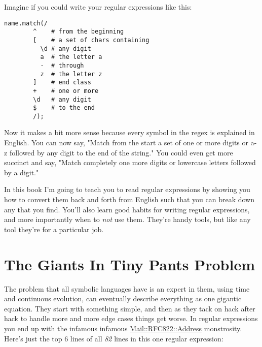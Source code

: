 Imagine if you could write your regular expressions like this:

\begin{lstlisting}
name.match(/
        ^    # from the beginning
        [    # a set of chars containing
          \d # any digit
          a  # the letter a
          -  # through
          z  # the letter z
        ]    # end class
        +    # one or more
        \d   # any digit
        $    # to the end
        /);
\end{lstlisting}

Now it makes a bit more sense because every symbol in the regex is explained in
English.  You can now say, "Match from the start a set of one or more digits or
a-z followed by any digit to the end of the string." You could even get more
succinct and say, "Match completely one more digits or lowercase letters
followed by a digit."

In this book I'm going to teach you to read regular expressions by showing you how
to convert them back and forth from English such that you can break down any that you
find.  You'll also learn good habits for writing regular expressions, and more importantly
when to \emph{not} use them.  They're handy tools, but like any tool they're for
a particular job.

\section{The Giants In Tiny Pants Problem}

The problem that all symbolic languages have is an expert in them, using time
and continuous evolution, can eventually describe everything as one gigantic
equation.  They start with something simple, and then as they tack on hack
after hack to handle more and more edge cases things get worse.  In regular
expressions you end up with the infamous infamous
\href{http://www.ex-parrot.com/pdw/Mail-RFC822-Address.html}{Mail::RFC822::Address}
monstrosity.  Here's just the top 6 lines of all \emph{82} lines in this
one regular expression:

